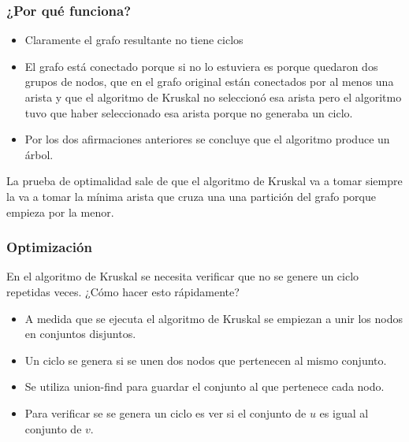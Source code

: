 \documentclass{beamer}
\begin{document}
	\begin{frame}
		\frametitle{¿Por qué funciona?}
		\begin{itemize}
			\item Claramente el grafo resultante no tiene ciclos
			\item El grafo está conectado porque si no lo estuviera es porque quedaron dos grupos de nodos, que en el grafo original están conectados por al menos una arista y que el algoritmo de Kruskal no seleccionó esa arista pero el algoritmo tuvo que haber seleccionado esa arista porque no generaba un ciclo.
			\item Por los dos afirmaciones anteriores se concluye que el algoritmo produce un árbol.
		\end{itemize}
		La prueba de optimalidad sale de que el algoritmo de Kruskal va a tomar siempre la va a tomar la mínima arista que cruza una una partición del grafo porque empieza por la menor.
	\end{frame}

	\begin{frame}
		\frametitle{Optimización}
		En el algoritmo de Kruskal se necesita verificar que no se genere un ciclo repetidas veces. ¿Cómo hacer esto rápidamente?
		\pause
		\begin{itemize}
			\item A medida que se ejecuta el algoritmo de Kruskal se empiezan a unir los nodos en conjuntos disjuntos.
			\item Un ciclo se genera si se unen dos nodos que pertenecen al mismo conjunto.
			\item Se utiliza union-find para guardar el conjunto al que pertenece cada nodo.
			\item Para verificar se se genera un ciclo es ver si el conjunto de $u$ es igual al conjunto de $v$.
		\end{itemize}
	\end{frame}
\end{document}
